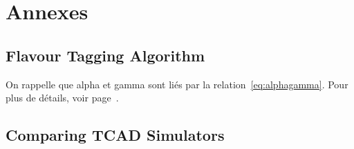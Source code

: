\chapter{Annexes}



\section{Flavour Tagging Algorithm}
	\blindtext
	On rappelle que \gls{alpha} et \gls{gamma} sont liés par la relation~\eqref{eq:alphagamma}. Pour plus de détails, voir page~\pageref{eq:alphagamma}.

\section{Comparing TCAD Simulators}
	\blindtext